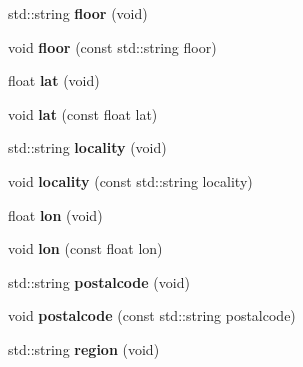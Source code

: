 \begin{DoxyCompactItemize}
\item 
\hypertarget{classGeoloc_a7e6beff61e9614667bde4a834eb46764}{
std::string {\bfseries floor} (void)}
\label{classGeoloc_a7e6beff61e9614667bde4a834eb46764}

\item 
\hypertarget{classGeoloc_a22b052979675eafcad33b192bb12cd1d}{
void {\bfseries floor} (const std::string floor)}
\label{classGeoloc_a22b052979675eafcad33b192bb12cd1d}

\item 
\hypertarget{classGeoloc_aaeb3d6ba384ea7e8ab9a6e7dfa920b18}{
float {\bfseries lat} (void)}
\label{classGeoloc_aaeb3d6ba384ea7e8ab9a6e7dfa920b18}

\item 
\hypertarget{classGeoloc_af259dc54286bca5bec3415fc96e77e4d}{
void {\bfseries lat} (const float lat)}
\label{classGeoloc_af259dc54286bca5bec3415fc96e77e4d}

\item 
\hypertarget{classGeoloc_afc93a65f7f6de5717aaddc290f4c57a5}{
std::string {\bfseries locality} (void)}
\label{classGeoloc_afc93a65f7f6de5717aaddc290f4c57a5}

\item 
\hypertarget{classGeoloc_ab4674f40e645109ca3b90ad8528bc19b}{
void {\bfseries locality} (const std::string locality)}
\label{classGeoloc_ab4674f40e645109ca3b90ad8528bc19b}

\item 
\hypertarget{classGeoloc_aab30ea29128147a9d021f49f67aa00f0}{
float {\bfseries lon} (void)}
\label{classGeoloc_aab30ea29128147a9d021f49f67aa00f0}

\item 
\hypertarget{classGeoloc_a4df17774670f7784c4ff95837df82f66}{
void {\bfseries lon} (const float lon)}
\label{classGeoloc_a4df17774670f7784c4ff95837df82f66}

\item 
\hypertarget{classGeoloc_ae49ab62748ba7b9c45e78b1cfb208aa1}{
std::string {\bfseries postalcode} (void)}
\label{classGeoloc_ae49ab62748ba7b9c45e78b1cfb208aa1}

\item 
\hypertarget{classGeoloc_a124cef4ffce63c96009f0dbe550a0a43}{
void {\bfseries postalcode} (const std::string postalcode)}
\label{classGeoloc_a124cef4ffce63c96009f0dbe550a0a43}

\item 
\hypertarget{classGeoloc_af33006c3f3781ff43d35b7e1cb0a4144}{
std::string {\bfseries region} (void)}
\label{classGeoloc_af33006c3f3781ff43d35b7e1cb0a4144}


\end{DoxyCompactItemize}
